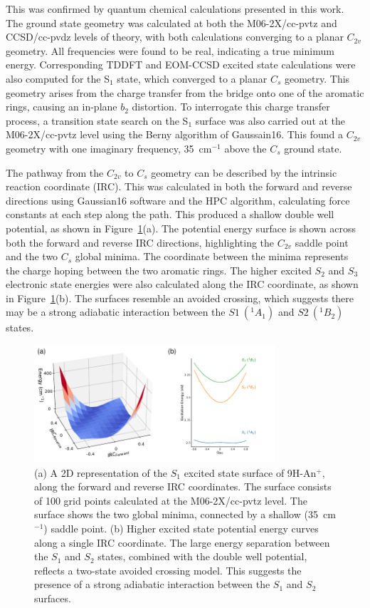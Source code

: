 \documentclass[journal=jpcafh,manuscript=article,layout=onecolumn, 12pt]{achemso}
\begin{document}
This was confirmed by quantum chemical calculations presented in this work. The ground state geometry was calculated at both the M06-2X/cc-pvtz and CCSD/cc-pvdz levels of theory, with both calculations converging to a planar $C_{2v}$ geometry. All frequencies were found to be real, indicating a true minimum energy. Corresponding TDDFT and EOM-CCSD excited state calculations were also computed for the S$_1$ state, which converged to a planar $C_s$ geometry. This geometry arises from the charge transfer from the bridge onto one of the aromatic rings, causing an in-plane $b_2$ distortion. To interrogate this charge transfer process, a transition state search on the S$_1$ surface was also carried out at the M06-2X/cc-pvtz level using the Berny algorithm of Gaussain16. This found a $C_{2v}$ geometry with one imaginary frequency, 35~cm$^{-1}$ above the $C_s$ ground state.

The pathway from the $C_{2v}$ to $C_s$ geometry can be described by the intrinsic reaction coordinate (IRC). This was calculated in both the forward and reverse directions using Gaussian16 software and the HPC algorithm, calculating force constants at each step along the path. This produced a shallow double well potential, as shown in Figure~\ref{Fig:2}(a). The potential energy surface is shown across both the forward and reverse IRC directions, highlighting the $C_{2v}$ saddle point and the two $C_s$ global minima. The coordinate between the minima represents the charge hoping between the two aromatic rings. The higher excited $S_2$ and $S_3$ electronic state energies were also calculated along the IRC coordinate, as shown in Figure~\ref{Fig:2}(b). The surfaces resemble an avoided crossing, which suggests there may be a strong adiabatic interaction between the $S1~(^1A_1)$ and $S2~(^1B_2)$ states.  

\begin{figure} [h]
	\includegraphics[width=0.8\textwidth]{figures/Figure2}
	\caption{(a) A 2D representation of the $S_1$ excited state surface of 9H-An$^+$, along the forward and reverse IRC coordinates. The surface consists of 100 grid points calculated at the M06-2X/cc-pvtz level. The surface shows the two global minima, connected by a shallow (35~cm$^{-1}$) saddle point. (b) Higher excited state potential energy curves along a single IRC coordinate. The large energy separation between the $S_1$ and $S_2$ states, combined with the double well potential, reflects a two-state avoided crossing model. This suggests the presence of a strong adiabatic interaction between the $S_1$ and $S_2$ surfaces. }
	\label{Fig:2}
\end{figure}
\end{document}
